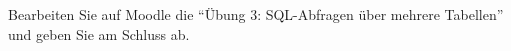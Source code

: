 
  \begin{myexercise}
    Bearbeiten Sie auf Moodle die \enquote{Übung 3: SQL-Abfragen über mehrere Tabellen} und geben Sie am Schluss ab.
  \end{myexercise}





